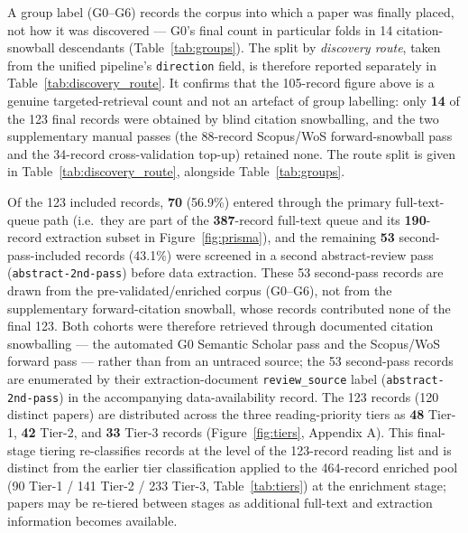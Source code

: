 A group label (G0--G6) records the corpus into which a paper was finally
placed, not how it was discovered --- G0's final count in particular folds in
14 citation-snowball descendants (Table~\ref{tab:groups}). The split by
\emph{discovery route}, taken from the unified pipeline's \texttt{direction}
field, is therefore reported separately in Table~\ref{tab:discovery_route}. It
confirms that the 105-record figure above is a genuine targeted-retrieval
count and not an artefact of group labelling: only \textbf{14} of the 123
final records were obtained by blind citation snowballing, and the two
supplementary manual passes (the 88-record Scopus/WoS forward-snowball pass and
the 34-record cross-validation top-up) retained none. The route split is given
in Table~\ref{tab:discovery_route}, alongside Table~\ref{tab:groups}.

Of the 123 included records, \textbf{70} (56.9\%) entered through the primary
full-text-queue path (i.e.\ they are part of the \textbf{387}-record full-text
queue and its \textbf{190}-record extraction subset in
Figure~\ref{fig:prisma}), and the remaining \textbf{53} second-pass-included records (43.1\%) were
screened in a second abstract-review pass (\texttt{abstract-2nd-pass}) before
data extraction.
These 53 second-pass records are drawn from the pre-validated/enriched corpus
(G0--G6), not from the supplementary forward-citation snowball, whose records
contributed none of the final 123. Both cohorts
were therefore retrieved through documented citation snowballing --- the
automated G0 Semantic Scholar pass and the Scopus/WoS forward pass --- rather
than from an untraced source; the 53 second-pass records are enumerated by
their extraction-document \texttt{review\_source} label
(\texttt{abstract-2nd-pass}) in the accompanying data-availability record. The
123 records (120 distinct papers) are distributed across the three
reading-priority tiers as \textbf{48} Tier-1, \textbf{42} Tier-2, and
\textbf{33} Tier-3 records (Figure~\ref{fig:tiers}, Appendix A). This
final-stage tiering re-classifies records at the level of the 123-record
reading list and is distinct from the earlier tier classification applied to
the 464-record enriched pool (90 Tier-1 / 141 Tier-2 / 233 Tier-3,
Table~\ref{tab:tiers}) at the enrichment stage;
papers may be re-tiered between stages as additional full-text and extraction
information becomes available.

